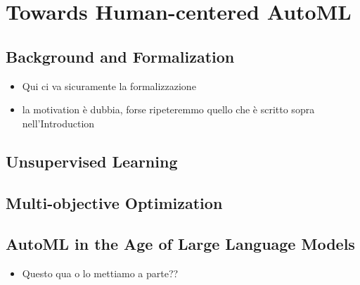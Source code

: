 \documentclass[a4paper,12pt,times,numbered,print,index]{Classes/PhDThesisPSnPDF}
\begin{document}



\part{Towards Human-centered AutoML}\label{part:automl}


\chapter{Background and Formalization}
\label{automl-chap:background}
\begin{itemize}
    \item Qui ci va sicuramente la formalizzazione
    \item la motivation è dubbia, forse ripeteremmo quello che è scritto sopra nell'Introduction
\end{itemize}

% 

% 
% 
% 


\chapter{Unsupervised Learning}
\label{automl-chap:unsupervised}

\chapter{Multi-objective Optimization}
\label{automl-chap:moo}

\chapter{AutoML in the Age of Large Language Models}
\label{automl-chap:llm}
\begin{itemize}
    \item Questo qua o lo mettiamo a parte??
\end{itemize}
\end{document}
